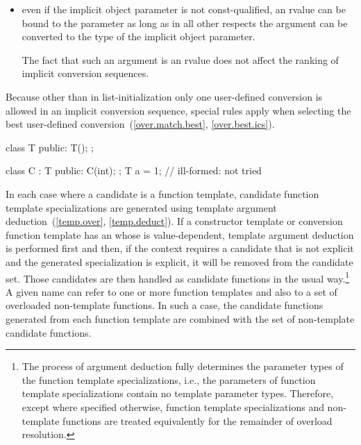 \begin{itemize}
\item
even if the implicit object parameter is not
const-qualified,
an rvalue can be bound to the parameter
as long as in all other respects the argument can be
converted to the type of the implicit object parameter.
\begin{note} The fact that such an argument is an rvalue does not
affect the ranking of implicit conversion sequences.
\end{note}
\end{itemize}

\pnum
Because other than in list-initialization only one user-defined conversion
is allowed
in an
implicit conversion sequence, special rules apply when selecting
the best user-defined conversion~(\ref{over.match.best},
\ref{over.best.ics}).
\begin{example}

\begin{codeblock}
class T {
public:
  T();
};

class C : T {
public:
  C(int);
};
T a = 1;            // ill-formed:  not tried
\end{codeblock}
\end{example}

\pnum
In each case where a candidate is a function template, candidate
function template specializations
are generated using template argument deduction~(\ref{temp.over},
\ref{temp.deduct}).
If a constructor template or conversion function template
has an 
whose  is value-dependent,
template argument deduction is performed first and then,
if the context requires a candidate that
is not explicit and the generated specialization is explicit,
it will be removed from the candidate set.
Those candidates are then handled as candidate
functions in the usual way.\footnote{The process of argument deduction fully
determines the parameter types of
the
function template specializations,
i.e., the parameters of
function template specializations
contain
no template parameter types.
Therefore, except where specified otherwise,
function template specializations
and non-template functions are treated equivalently
for the remainder of overload resolution.}
A given name can refer to one or more function templates and also
to a set of overloaded non-template functions.
In such a case, the
candidate functions generated from each function template are combined
with the set of non-template candidate functions.

